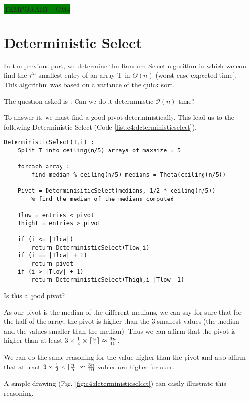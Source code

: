 \colorbox{green}{TEMPORARY - CM4}


\section{Deterministic Select}

In the previous part, we determine the Random Select algorithm in which we can find the $i^{th}$ smallest entry of an array T in $\Theta (n)$ (worst-case expected time). This algorithm was based on a variance of the quick sort.

The question asked is : Can we do it deterministic $\mathcal{O}(n)$ time?

To answer it, we must find a good pivot deterministically. This lead us to the following Deterministic Select (Code \ref{list:c4:deterministicselect}).

\begin{lstlisting}[label={list:c4:deterministicselect},caption=Pseudo-code of the Determinisic Select algorithm]
DeterministicSelect(T,i) :
    Split T into ceiling(n/5) arrays of maxsize = 5 
    
    foreach array : 
        find median % ceiling(n/5) medians = Theta(ceiling(n/5))
        
    Pivot = DeterminisiticSelect(medians, 1/2 * ceiling(n/5)) 
        % find the median of the medians computed
    
    Tlow = entries < pivot
    Thight = entries > pivot
    
    if (i <= |Tlow|)
        return DeterministicSelect(Tlow,i)
    if (i == |Tlow| + 1) 
        return pivot
    if (i > |Tlow| + 1)
        return DeterministicSelect(Thigh,i-|Tlow|-1)
\end{lstlisting}



Is this a good pivot?

As our pivot is the median of the different medians, we can say for sure that for the half of the array, the pivot is higher than the 3 smallest values (the median and the values smaller than the median). Thus we can affirm that the pivot is higher than at least $3\times \frac{1}{2} \times \lceil \frac{n}{5} \rceil \approx \frac{3n}{10}$.

We can do the same reasoning for the value higher than the pivot and also affirm that at least $3\times \frac{1}{2} \times \lceil \frac{n}{5} \rceil \approx \frac{3n}{10}$ values are higher for sure.

A simple drawing (Fig. \ref{fig:c4:deterministicselect}) can easily illustrate this reasoning.

